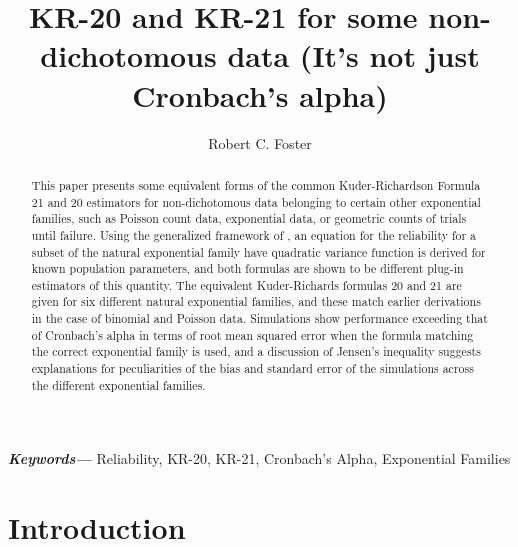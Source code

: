 \documentclass[12pt,epsfig]{article}
\providecommand{\keywords}[1]
{
  \small	
  \textbf{\textit{Keywords---}} #1
}
\begin{document}



\title{KR-20 and KR-21 for some non-dichotomous data (It's not just Cronbach's alpha)}
\author{Robert C. Foster}
\date{}
\maketitle


\begin{abstract}
This paper presents some equivalent forms of the common Kuder-Richardson Formula 21 and 20 estimators for non-dichotomous data belonging to certain other exponential families, such as Poisson count data, exponential data, or geometric counts of trials until failure. Using the generalized framework of \cite{Foster2020}, an equation for the reliability for a subset of the natural exponential family have quadratic variance function is derived for known population parameters, and both formulas are shown to be different plug-in estimators of this quantity. The equivalent Kuder-Richards formulas 20 and 21 are given for six different natural exponential families, and these match earlier derivations in the case of binomial and Poisson data. Simulations show performance exceeding that of Cronbach's alpha in terms of root mean squared error when the formula matching the correct exponential family is used, and a discussion of Jensen's inequality suggests explanations for peculiarities of the bias and standard error of the simulations across the different exponential families.
\end{abstract}

\keywords{Reliability, KR-20, KR-21, Cronbach's Alpha, Exponential Families}


\newpage




\section{Introduction}
\end{document}
